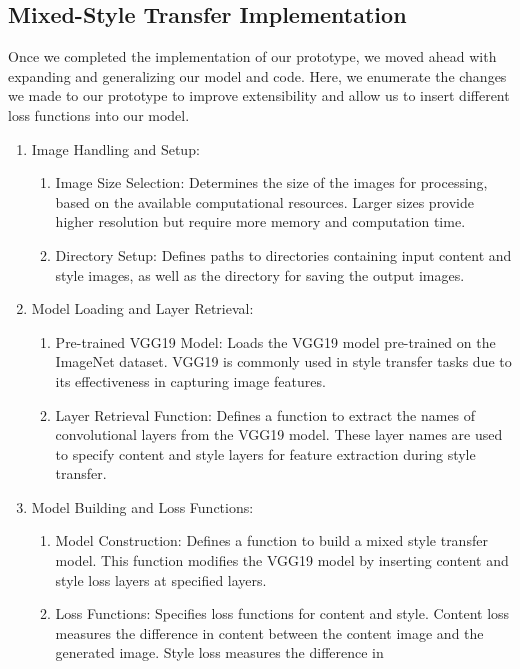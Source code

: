 \documentclass[12pt]{article}
\begin{document}
\subsection{Mixed-Style Transfer Implementation}
Once we completed the implementation of our prototype, we moved ahead with
expanding and generalizing our model and code.  Here, we enumerate the changes
we made to our prototype to improve extensibility and allow us to insert
different loss functions into our model.
\begin{enumerate}
    \item Image Handling and Setup:
    \begin{enumerate}
        \item Image Size Selection: Determines the size of the images for
        processing, based on the available computational resources. Larger sizes
        provide higher resolution but require more memory and computation time. 
        \item Directory Setup: Defines paths to directories containing input
        content and style images, as well as the directory for saving the output
        images. 
    \end{enumerate}
    \item Model Loading and Layer Retrieval:
    \begin{enumerate}
        \item Pre-trained VGG19 Model: Loads the VGG19 model pre-trained on the
        ImageNet dataset. VGG19 is commonly used in style transfer tasks due to
        its effectiveness in capturing image features. 
        \item Layer Retrieval Function: Defines a function to extract the names
        of convolutional layers from the VGG19 model. These layer names are used
        to specify content and style layers for feature extraction during style
        transfer.    
    \end{enumerate}
    \item Model Building and Loss Functions:
    \begin{enumerate}
        \item Model Construction: Defines a function to build a mixed style
        transfer model. This function modifies the VGG19 model by inserting
        content and style loss layers at specified layers.
        \item Loss Functions: Specifies loss functions for content and style.
        Content loss measures the difference in content between the content
        image and the generated image. Style loss measures the difference in

\end{enumerate}
\end{enumerate}
\end{document}
